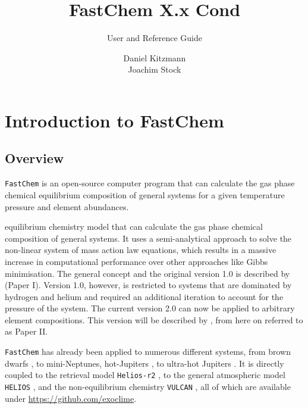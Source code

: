 \documentclass[numbers=noenddot]{aux/fcmanual}
\author{Daniel Kitzmann\\
	    Joachim Stock
}
\title{FastChem X.x Cond}
\subtitle{User and Reference Guide}
\date{}
\newcommand{\fc}{\texttt{FastChem}\xspace}
\newcommand{\ttt}[1]{\texttt {#1}}
\begin{document}
\maketitle


\tableofcontents

\chapter{Introduction to FastChem}

\section{Overview}

\fc is an open-source computer program that can calculate the gas phase chemical equilibrium composition of general systems for a given temperature pressure and element abundances.


equilibrium chemistry model that can calculate the gas phase chemical composition of general systems. It uses a semi-analytical approach to solve the non-linear system of mass action law equations, which results in a massive increase in computational performance over other approaches like Gibbs minimisation. The general concept and the original version 1.0 is described by \citet{Stock2018MNRAS.479..865S} (Paper I). Version 1.0, however, is restricted to systems that are dominated by hydrogen and helium and required an additional iteration to account for the pressure of the system. The current version 2.0 can now be applied to arbitrary element compositions. This version will be described by \citet{Stock2022MNRAS.517.4070S}, from here on referred to as Paper II.

\fc has already been applied to numerous different systems, from brown dwarfs \citep{Kitzmann2020ApJ...890..174K}, to mini-Neptunes, hot-Jupiters \citep{Bourrier2020A&A...637A..36B}, to ultra-hot Jupiters \citep{Hoeijmakers2019A&A...627A.165H}. It is directly coupled to the retrieval model \ttt{Helios-r2} \citep{Kitzmann2020ApJ...890..174K}, to the general atmospheric model \ttt{HELIOS} \citep{Malik2019AJ....157..170M}, and the non-equilibrium chemistry \ttt{VULCAN} \citep{Tsai2018ApJ...862...31T}, all of which are available under \url{https://github.com/exoclime}.


%
\end{document}
